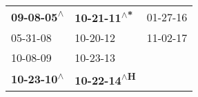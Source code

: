 \begin{supertabular}{lll}
 \textbf{09-08-05\textsuperscript{$\wedge$}} &  \textbf{10-21-11\textsuperscript{$\wedge$*}} &  01-27-16\textsuperscript{} \\
                  05-31-08\textsuperscript{} &                    10-20-12\textsuperscript{} &  11-02-17\textsuperscript{} \\
                  10-08-09\textsuperscript{} &                    10-23-13\textsuperscript{} &                             \\
 \textbf{10-23-10\textsuperscript{$\wedge$}} &  \textbf{10-22-14\textsuperscript{$\wedge$H}} &                             \\
\end{supertabular}
